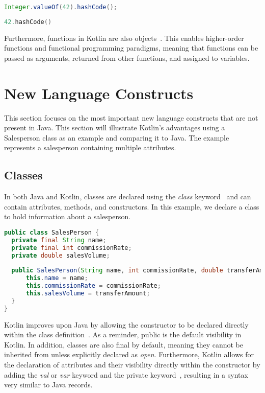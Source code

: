 \documentclass[a4paper, 11pt]{article}
\begin{document}
\begin{lstlisting}[language=Java,title={Java Integer Wrapper}]
Integer.valueOf(42).hashCode();
\end{lstlisting}

\begin{lstlisting}[language=Kotlin,title={Kotlin direct usage of Int}]
42.hashCode()
\end{lstlisting}

Furthermore, functions in Kotlin are also objects~\cite{higher-order-functions}. This enables higher-order functions and functional programming paradigms, meaning that functions can be passed as arguments, returned from other functions, and assigned to variables.

\section{New Language Constructs} %
This section focuses on the most important new language constructs that are not present in Java. 
This section will illustrate Kotlin's advantages using a Salesperson class as an example and comparing it to Java.
The example represents a salesperson containing multiple attributes.
\subsection{Classes}
In both Java and Kotlin, classes are declared using the \textit{class} keyword~\cite{classes} and can contain attributes, methods, and constructors. In this example, we declare a class to hold information about a salesperson.

\begin{lstlisting}[language=Java,title={Java Class Declaration}]
public class SalesPerson {
  private final String name;
  private final int commissionRate;
  private double salesVolume;
  
  public SalesPerson(String name, int commissionRate, double transferAmount) {
      this.name = name;
      this.commissionRate = commissionRate;
      this.salesVolume = transferAmount;
  }
}
\end{lstlisting}

Kotlin improves upon Java by allowing the constructor to be declared directly within the class definition~\cite{classes-constructors}. As a reminder, public is the default visibility in Kotlin. In addition, classes are also final by default, meaning they cannot be inherited from unless explicitly declared as \textit{open}.
Furthermore, Kotlin allows for the declaration of attributes and their visibility directly within the constructor by adding the \textit{val} or \textit{var} keyword and the private keyword~\cite{classes-constructors}, resulting in a syntax very similar to Java records.
\end{document}
